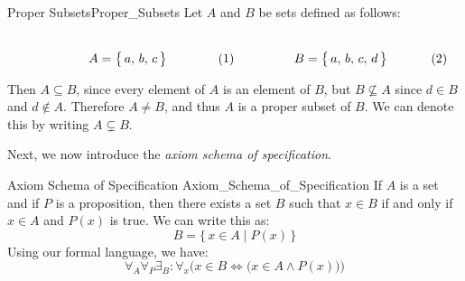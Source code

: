         \begin{lexample}{Proper Subsets}{Proper_Subsets}
            Let $A$ and $B$ be sets defined as follows:
            \par
            \begin{subequations}
                \begin{minipage}[b]{0.49\textwidth}
                    \centering
                    \begin{equation}
                        A=\big\{\,a,\,b,\,c\,\big\}
                    \end{equation}
                \end{minipage}
                \hfill
                \begin{minipage}[b]{0.49\textwidth}
                    \centering
                    \begin{equation}
                        B=\big\{\,a,\,b,\,c,\,d\,\big\}
                    \end{equation}
                \end{minipage}
            \end{subequations}
            \par\vspace{2.5ex}
            Then $A\subseteq{B}$, since every element of $A$ is an element of
            $B$, but $B\nsubseteq{A}$ since $d\in{B}$ and $d\notin{A}$.
            Therefore $A\ne{B}$, and thus $A$ is a proper subset of $B$. We can
            denote this by writing $A\subsetneq{B}$.
        \end{lexample}
        Next, we now introduce the \textit{axiom schema of specification}.
        \begin{faxiom}{Axiom Schema of Specification}
                      {Axiom_Schema_of_Specification}
            If $A$ is a set and if $P$ is a proposition, then there exists a set
            $B$ such that $x\in{B}$ if and only if $x\in{A}$ and $P(x)$ is true.
            We can write this as:
            \begin{equation*}
                B=\big\{\,x\in{A}\;|\;P(x)\,\big\}
            \end{equation*}
            Using our formal language, we have:
            \begin{equation*}
                \forall_{A}\forall_{P}\exists_{B}:
                \forall_{x}\Big(x\in{B}\Leftrightarrow
                \big(x\in{A}\land{P}(x)\big)\Big)
            \end{equation*}
        \end{faxiom}
